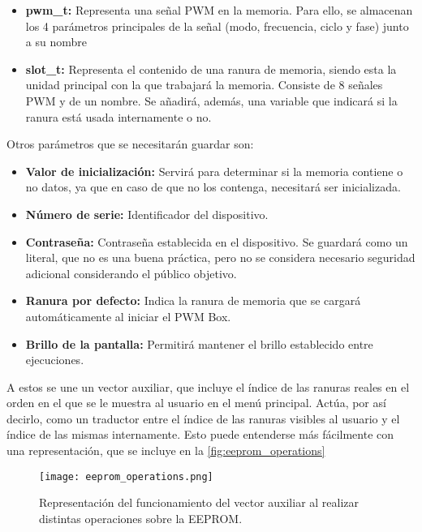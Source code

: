 \begin{itemize}
    \item\textbf{pwm\_t:} Representa una señal PWM en la memoria. Para ello, se almacenan los 4 parámetros principales de la señal (modo, frecuencia, ciclo y fase) junto a su nombre
    \item\textbf{slot\_t:} Representa el contenido de una ranura de memoria, siendo esta la unidad principal con la que trabajará la memoria. Consiste de 8 señales PWM y de un nombre. Se añadirá, además, una variable que indicará si la ranura está usada internamente o no.
\end{itemize}

Otros parámetros que se necesitarán guardar son:

\begin{itemize}
    \item\textbf{Valor de inicialización:} Servirá para determinar si la memoria contiene o no datos, ya que en caso de que no los contenga, necesitará ser inicializada.
    \item\textbf{Número de serie:} Identificador del dispositivo.
    \item\textbf{Contraseña:} Contraseña establecida en el dispositivo. Se guardará como un literal, que no es una buena práctica, pero no se considera necesario seguridad adicional considerando el público objetivo.
    \item\textbf{Ranura por defecto:} Indica la ranura de memoria que se cargará automáticamente al iniciar el PWM Box.
    \item\textbf{Brillo de la pantalla:} Permitirá mantener el brillo establecido entre ejecuciones.
\end{itemize}

A estos se une un vector auxiliar, que incluye el índice de las ranuras reales en el orden en el que se le muestra al usuario en el menú principal. Actúa, por así decirlo, como un traductor entre el índice de las ranuras visibles al usuario y el índice de las mismas internamente. Esto puede entenderse más fácilmente con una representación, que se incluye en la \autoref{fig:eeprom_operations}

\begin{figure}
    \centering
    \texttt{[image: eeprom\_operations.png]}
    \caption{Representación del funcionamiento del vector auxiliar al realizar distintas operaciones sobre la EEPROM.}
    \label{fig:eeprom_operations}
\end{figure}

